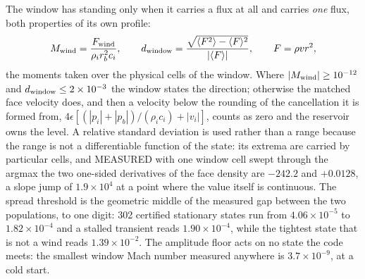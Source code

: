 The window has standing only when it carries a flux at all and carries
\emph{one} flux, both properties of its own profile:
%
\begin{equation}
  M_{\rm wind} = \frac{F_{\rm wind}}{\rho_i r_b^2 c_i},
  \qquad
  d_{\rm window} = \frac{\sqrt{\langle F^2\rangle - \langle F\rangle^2}}
                        {|\langle F\rangle|},
  \qquad F = \rho v r^2 ,
  \label{eq:wind_window_say}
\end{equation}
%
the moments taken over the physical cells of the window.  Where
$|M_{\rm wind}| \ge 10^{-12}$ and $d_{\rm window}\le 2\times10^{-3}$ the
window states the direction; otherwise the matched face velocity does, and
then a velocity below the rounding of the cancellation it is formed from,
$4\epsilon[(|p_i|+|p_b|)/(\rho_ic_i) + |v_i|]$, counts as zero and the
reservoir owns the level.  A relative standard deviation is used rather than
a range because the range is not a differentiable function of the state: its
extrema are carried by particular cells, and MEASURED with one window cell
swept through the argmax the two one-sided derivatives of the face density
are $-242.2$ and $+0.0128$, a slope jump of $1.9\times10^4$ at a point where
the value itself is continuous.  The spread threshold is the geometric middle
of the measured gap between the two populations, to one digit: 302 certified
stationary states run from $4.06\times10^{-5}$ to $1.82\times10^{-4}$ and a
stalled transient reads $1.90\times10^{-4}$, while the tightest state that is
not a wind reads $1.39\times10^{-2}$.  The amplitude floor acts on no state
the code meets: the smallest window Mach number measured anywhere is
$3.7\times10^{-9}$, at a cold start.

